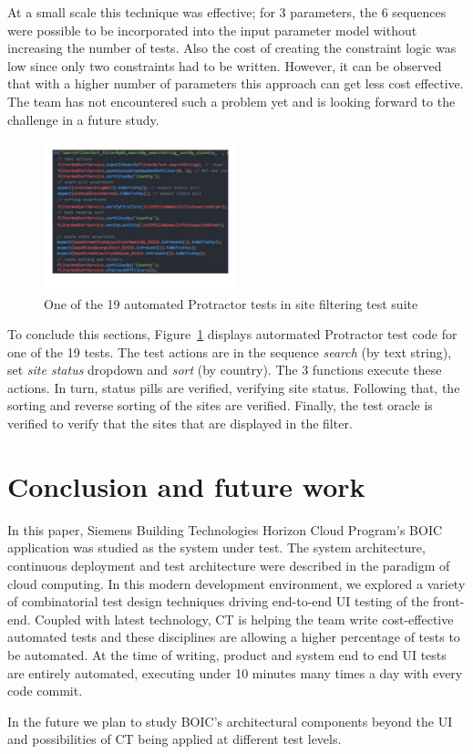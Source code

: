 \documentclass[conference]{IEEEtran}
\begin{document}
	At a small scale this technique was effective; for 3 parameters, the 6 sequences were possible to be incorporated into the input parameter model without increasing the number of tests. 
	Also the cost of creating the constraint logic was low since only two constraints had to be written.
	However, it can be observed that with a higher number of parameters this approach can get less cost effective. 
	The team has not encountered such a problem yet and is looking forward to the challenge in a future study.
	
	\begin{figure}[!h]
		\includegraphics[width=0.50\textwidth,]{sortingTestCode.pdf}
		\caption{One of the 19 automated Protractor tests in site filtering test suite}
		\label{fig:sortingTestCode}
	\end{figure}

	To conclude this sections, Figure~\ref{fig:sortingTestCode} displays autormated Protractor test code for one of the 19 tests.
	The test actions are in the sequence \textit{search} (by text string), set \textit{site status} dropdown and \textit{sort} (by country). 
	The 3 functions execute these actions.
	In turn, status pills are verified, verifying site status.
	Following that, the sorting and reverse sorting of the sites are verified.
	Finally, the test oracle is verified to verify that the sites that are displayed in the filter.
		
\section{Conclusion and future work}
In this paper, Siemens Building Technologies Horizon Cloud Program’s BOIC application was studied as the system under test.
The system architecture, continuous deployment and test architecture were described in the paradigm of cloud computing.
In this modern development environment, we explored a variety of combinatorial test design techniques driving end-to-end UI testing of the front-end.
Coupled with latest technology, CT is helping the team write cost-effective automated tests and these disciplines are allowing a higher percentage of tests to be automated.
At the time of writing, product and system end to end UI tests are entirely automated, executing under 10 minutes many times a day with every code commit.

In the future we plan to study BOIC's architectural components beyond the UI and possibilities of CT being applied at different test levels. 



\end{document}
